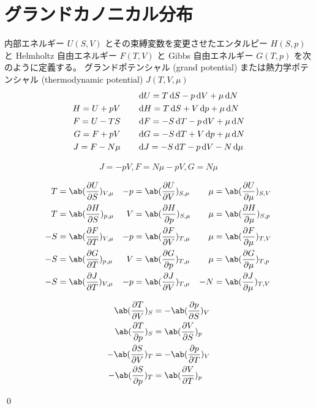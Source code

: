 \documentclass[uplatex,diffipdfmx,a4paper,11pt]{jlreq}
\makeatletter
\theoremstyle{definition}
\renewenvironment{proof}[1][\proofname]{\par
  \normalfont
  \topsep6\p@\@plus6\p@ \trivlist
  \item[\hskip\labelsep{\bfseries #1}\@addpunct{\bfseries}]\ignorespaces\quad\par
}{%
  \qed\endtrivlist\@endpefalse
}
\renewcommand\proofname{証明}
\makeatother
\begin{document}
\section{グランドカノニカル分布}
\begin{definition}
  内部エネルギー $U(S, V)$ とその束縛変数を変更させたエンタルピー $H(S, p)$ と Helmholtz 自由エネルギー $F(T, V)$ と Gibbs 自由エネルギー $G(T, p)$ を次のように定義する。
  グランドポテンシャル (grand potential) または熱力学ポテンシャル (thermodynamic potential) $J(T, V, \mu)$
  \begin{align}
                 & \qquad \dl{U} = T\dl{S} - p\dl{V} + \mu\dl{N}  \\
    H = U + pV   & \qquad \dl{H} = T\dl{S} + V\dl{p} + \mu\dl{N}  \\
    F = U - TS   & \qquad \dl{F} = -S\dl{T} - p\dl{V} + \mu\dl{N} \\
    G = F + pV   & \qquad \dl{G} = -S\dl{T} + V\dl{p} + \mu\dl{N} \\
    J = F - N\mu & \qquad \dl{J} = -S\dl{T} - p\dl{V} - N\dl{\mu}
  \end{align}
\end{definition}

\begin{theorem}
  \begin{align}
    J = -pV, F = N\mu - pV, G = N\mu
  \end{align}
\end{theorem}

\begin{theorem}
  \begin{align}
    T  & = \ab(\diffp{U}{S})_{V,\mu} & -p & = \ab(\diffp{U}{V})_{S,\mu} & \mu & = \ab(\diffp{U}{\mu})_{S,V} \\
    T  & = \ab(\diffp{H}{S})_{p,\mu} & V  & = \ab(\diffp{H}{p})_{S,\mu} & \mu & = \ab(\diffp{H}{\mu})_{S,p} \\
    -S & = \ab(\diffp{F}{T})_{V,\mu} & -p & = \ab(\diffp{F}{V})_{T,\mu} & \mu & = \ab(\diffp{F}{\mu})_{T,V} \\
    -S & = \ab(\diffp{G}{T})_{p,\mu} & V  & = \ab(\diffp{G}{p})_{T,\mu} & \mu & = \ab(\diffp{G}{\mu})_{T,p} \\
    -S & = \ab(\diffp{J}{T})_{V,\mu} & -p & = \ab(\diffp{J}{V})_{T,\mu} & -N  & = \ab(\diffp{J}{\mu})_{T,V}
  \end{align}
\end{theorem}

\begin{proposition}
  \begin{align}
    \ab(\diffp{T}{V})_S  & = -\ab(\diffp{p}{S})_V \\
    \ab(\diffp{T}{p})_S  & = \ab(\diffp{V}{S})_p  \\
    -\ab(\diffp{S}{V})_T & = -\ab(\diffp{p}{T})_V \\
    -\ab(\diffp{S}{p})_T & = \ab(\diffp{V}{T})_p
  \end{align}
\end{proposition}
\begin{proof}
\end{proof}
\end{document}

